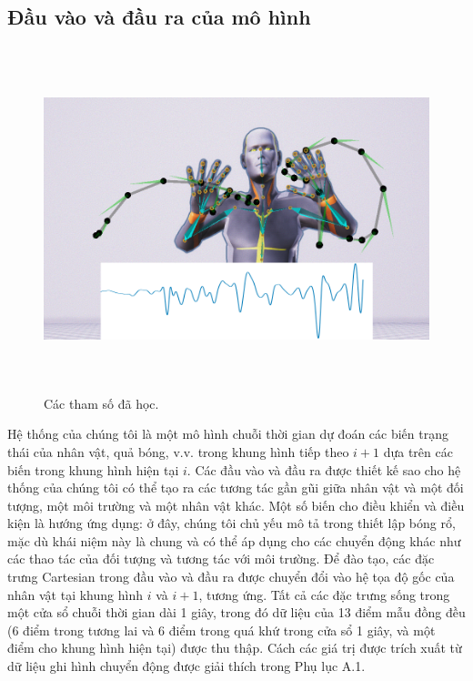 \subsection{Đầu vào và đầu ra của mô hình}
\label{System}



\begin{figure}
	\centering
	\includegraphics[height=10cm]{images/MotionSeries.png}
	\caption{Các tham số đã học.}
	\label{fig:MotionSeries}
\end{figure}

Hệ thống của chúng tôi là một mô hình chuỗi thời gian dự đoán các biến trạng thái của nhân vật, quả bóng, v.v. trong khung hình tiếp theo $i + 1$ dựa trên các biến trong khung hình hiện tại $i$. Các đầu vào và đầu ra được thiết kế sao cho hệ thống của chúng tôi có thể tạo ra các tương tác gần gũi giữa nhân vật và một đối tượng, một môi trường và một nhân vật khác. Một số biến cho điều khiển và điều kiện là hướng ứng dụng: ở đây, chúng tôi chủ yếu mô tả trong thiết lập bóng rổ, mặc dù khái niệm này là chung và có thể áp dụng cho các chuyển động khác như các thao tác của đối tượng và tương tác với môi trường. Để đào tạo, các đặc trưng Cartesian trong đầu vào và đầu ra được chuyển đổi vào hệ tọa độ gốc của nhân vật tại khung hình $i$ và $i + 1$, tương ứng. Tất cả các đặc trưng sống trong một cửa sổ chuỗi thời gian dài 1 giây, trong đó dữ liệu của 13 điểm mẫu đồng đều (6 điểm trong tương lai và 6 điểm trong quá khứ trong cửa sổ 1 giây, và một điểm cho khung hình hiện tại) được thu thập. Cách các giá trị được trích xuất từ dữ liệu ghi hình chuyển động được giải thích trong Phụ lục A.1.

